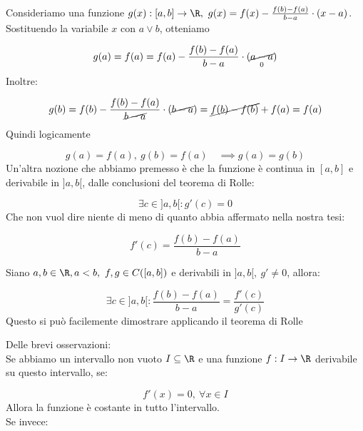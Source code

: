 \documentclass[../analisi.tex]{subfiles}
\begin{document}
\begin{dimo}
	Consideriamo una funzione $ g (x): [a,b] \to \R,\ g(x) = f ( x ) -
	\frac{f ( b ) - f ( a ) }{b - a} \cdot ( x - a )  $.\\
	Sostituendo la variabile $ x $ con $ a \lor b $, otteniamo 

	\begin{equation}
		g(a) = f ( a ) = f(a) - \frac{f ( b ) - f ( a ) }{b - a} \cdot 
		( \underset{0}{\cancel{a - a}} ) 
	\end{equation}
	Inoltre:

	\begin{equation}
		g(b) = f(b) - \frac{f ( b ) - f ( a ) }{ \cancel{b - a}} 
		\cdot  ( \cancel{b - a} )
		= \cancel{ f ( b ) - f ( b )} + f ( a ) = f ( a )  
	\end{equation}
	Quindi logicamente

	\begin{equation}
		g (a) = f(a),\ g(b) = f ( a )\quad \implies g(a) = g(b)
	\end{equation}
	Un'altra nozione che abbiamo premesso è che la funzione è continua in 
	$ [ a,b ]  $ e derivabile in $ ]a,b[ $, dalle conclusioni del 
	teorema di Rolle:

	\begin{equation}
		\exists c \in ]a,b[: g'(c) = 0		
	\end{equation}
	Che non vuol dire niente di meno di quanto abbia affermato nella
	nostra tesi:

	\begin{equation}
		f' ( c ) = \frac{f ( b ) - f ( a )}{b-a}
	\end{equation}
\end{dimo}


\begin{defn}[Cauchy]
Siano $ a,b \in \R, a<b,\ f,g \in C ( [ a,b ]  )  $ e derivabili 
in $ ]a,b[,\ g' \neq  0 $, allora:

\begin{equation}
	\exists c \in ]a,b[ : \frac{f ( b ) - f ( a ) }{ b - a } = 
	\frac{f' ( c ) }{g' (c) } 
\end{equation}
Questo si può facilemente dimostrare applicando il teorema di 
Rolle
\end{defn}
Delle brevi osservazioni:\\
Se abbiamo un intervallo non vuoto $ I \subseteq \R $ e una funzione $ f: I \to \R $
derivabile su questo intervallo, se: 

\begin{equation}
	f' ( x ) = 0, \ \forall x \in I 
\end{equation}
Allora la funzione è costante in tutto l'intervallo.\\
Se invece:
\end{document}
